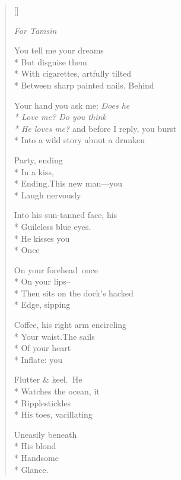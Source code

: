 \label{ch:what_i_mean_to_ask}
\begin{verse}[\versewidth]
\epigraph{\textit{For Tamsin}}{}
You tell me your dreams\\*
But disguise them\\*
With cigarettes, artfully tilted\\*
Between sharp painted nails. Behind

Your hand you ask me: \textit{Does he\\*
Love me? Do you think\\*
He loves me?} and before I reply, you burst\\*
Into a wild story about a drunken

Party, ending\\*
In a kiss,\\*
Ending.\quad This new man---you\\*
Laugh nervously

Into his sun-tanned face, his\\*
Guileless blue eyes.\\*
He kisses you\\*
Once

On your forehead\qquad once\\*
On your lips--\\*
Then sits on the dock's hacked\\*
Edge, sipping

Coffee, his right arm encircling\\*
Your waist.\quad The sails\\*
Of your heart\\*
Inflate: you

Flutter \& keel.\quad He\\*
Watches the ocean, it\\*
Ripples\qquad tickles\\*
His toes, vacillating

Uneasily beneath\\*
His blond\\*
Handsome\\*
Glance.
\end{verse}
